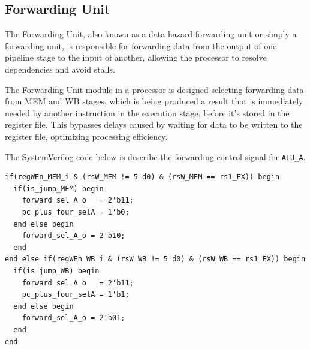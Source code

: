 \documentclass[12pt,a4paper,oneside]{book} %
\begin{document}
\subsection{Forwarding Unit}
The Forwarding Unit, also known as a data hazard forwarding unit or simply a forwarding unit, is responsible for forwarding data from the output of one pipeline stage to the input of another, allowing the processor to resolve dependencies and avoid stalls.


The Forwarding Unit module in a processor is designed selecting forwarding data from MEM and WB stages, which is being produced a result that is immediately needed by another instruction in the execution stage, before it's stored in the register file. This bypasses delays caused by waiting for data to be written to the register file, optimizing processing efficiency.

The SystemVerilog code below is describe the forwarding control signal for \texttt{ALU\_A}.
\begin{verbatim}
if(regWEn_MEM_i & (rsW_MEM != 5'd0) & (rsW_MEM == rs1_EX)) begin
  if(is_jump_MEM) begin
    forward_sel_A_o   = 2'b11;
    pc_plus_four_selA = 1'b0;
  end else begin
    forward_sel_A_o = 2'b10;
  end
end else if(regWEn_WB_i & (rsW_WB != 5'd0) & (rsW_WB == rs1_EX)) begin
  if(is_jump_WB) begin
    forward_sel_A_o   = 2'b11;
    pc_plus_four_selA = 1'b1;
  end else begin
    forward_sel_A_o = 2'b01;
  end
end
\end{verbatim}

\end{document}
